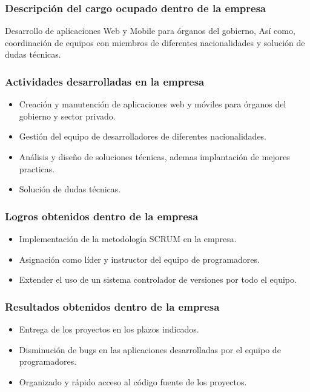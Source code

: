 \subsubsection{Descripción del cargo ocupado dentro de la empresa}
Desarrollo de aplicaciones Web y Mobile para órganos del gobierno, Así como, coordinación de equipos con miembros de diferentes nacionalidades y solución de dudas técnicas.

\subsubsection{Actividades desarrolladas en la empresa} 

\begin{itemize} 
	\item Creación y manutención de aplicaciones web y móviles para órganos del gobierno y sector privado.
	\item Gestión del equipo de desarrolladores de diferentes nacionalidades.
	\item Análisis y diseño de soluciones técnicas, ademas implantación de mejores practicas.
	\item Solución de dudas técnicas.
\end{itemize} 

\subsubsection{Logros obtenidos dentro de la empresa} 

\begin{itemize} 
	\item Implementación de la metodología SCRUM en la empresa.
	\item Asignación como líder y instructor del equipo de programadores. 
	\item Extender el uso de un sistema controlador de versiones por todo el equipo.
\end{itemize} 

\subsubsection{Resultados obtenidos dentro de la empresa}

\begin{itemize} 
	\item Entrega de los proyectos en los plazos indicados.
	\item Disminución de bugs en las aplicaciones desarrolladas por el equipo de programadores.
	\item Organizado y rápido acceso al código fuente de los proyectos.
\end{itemize} 

